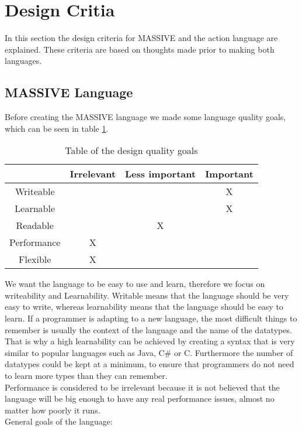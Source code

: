 \section{Design Critia}
\label{sec:designcrit}
In this section the design criteria for MASSIVE and the action language are explained. These criteria are based on thoughts made prior to making both languages.

\subsection{MASSIVE Language}
Before creating the MASSIVE language we made some language quality goals, which can be seen in table \ref{table:priorities}.

\begin{table}[ht]
\caption{Table of the design quality goals} %
\centering %
\begin{tabular}{cccc} %
\hline\hline %
 & Irrelevant & Less important & Important \\ [0.5ex] %
\hline %
Writeable &  &  & X\\ %
Learnable &  &  & X\\
Readable &  & X & \\
Performance & X &  & \\
Flexible & X &  & \\ [1ex] %
\hline %
\end{tabular} 
\label{table:priorities} %
\end{table}

We want the language to be easy to use and learn, therefore we focus on writeability and Learnability. Writable means that the language should be very easy to write, whereas learnability means that the language should be easy to learn. If a programmer is adapting to a new language, the most difficult things to remember is usually the context of the language and the name of the datatypes. That is why a high learnability can be achieved by creating a syntax that is very similar to popular languages such as Java, C\# or C. Furthermore the number of datatypes could be kept at a minimum, to ensure that programmers do not need to learn more types than they can remember.\\
\indent Performance is considered to be irrelevant because it is not believed that the language will be big enough to have any real performance issues, almost no matter how poorly it runs.\\
General goals of the language:

